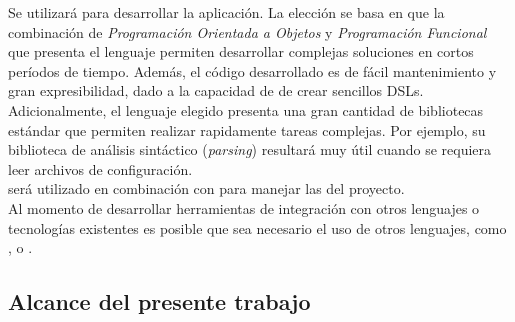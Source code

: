 Se utilizará \scala para desarrollar la aplicación. La elección se basa en que 
la combinación de \emph{Programación Orientada a Objetos} y \emph{Programación 
Funcional} que presenta el lenguaje permiten desarrollar complejas soluciones 
en cortos períodos de tiempo. Además, el código desarrollado es de fácil 
mantenimiento y gran expresibilidad, dado a la capacidad de \scala de crear 
sencillos DSLs.\\
Adicionalmente, el lenguaje elegido presenta una gran cantidad de bibliotecas 
estándar que permiten realizar rapidamente tareas complejas. Por ejemplo, su 
biblioteca de análisis sintáctico (\emph{parsing}) resultará muy útil cuando 
se requiera leer archivos de configuración.\\
\scala será utilizado en combinación con \sbt para manejar las \dependencies del 
proyecto.\\
Al momento de desarrollar herramientas de integración con otros lenguajes o 
tecnologías existentes es posible que sea necesario el uso de otros lenguajes, 
como \java, \clojure o \groovy.


\subsection{Alcance del presente trabajo}
\label{subsec:solution:todo}

